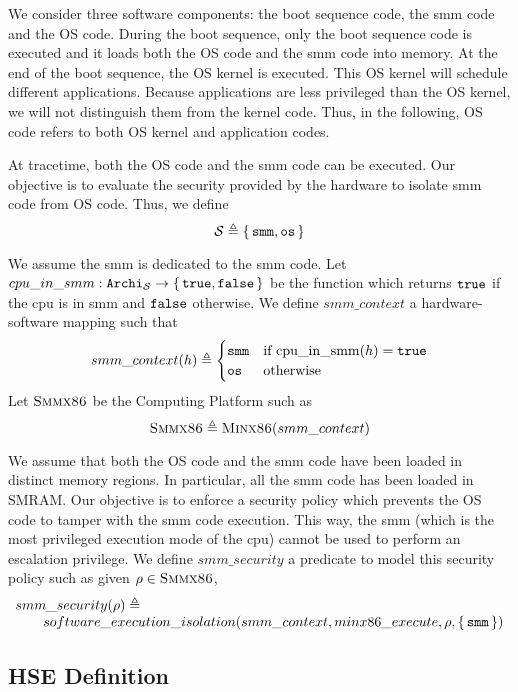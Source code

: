 We consider three software components: the boot sequence code, the \ac{smm} code
and the OS code.
%
During the boot sequence, only the boot sequence code is executed and it loads
both the OS code and the \ac{smm} code into memory.
%
At the end of the boot sequence, the OS kernel is executed.
%
This OS kernel will schedule different applications.
%
Because applications are less privileged than the OS kernel, we will not
distinguish them from the kernel code.
%
Thus, in the following, OS code refers to both OS kernel and application codes.

At tracetime, both the OS code and the \ac{smm} code can be executed.
%
Our objective is to evaluate the security provided by the hardware to isolate
\ac{smm} code from OS code.
%
Thus, we define
%
\[
  \mathcal{S} \triangleq \{\,\mathtt{smm}, \mathtt{os}\,\}
\]

We assume the \ac{smm} is dedicated to the \ac{smm} code.
%
Let
$cpu\_in\_smm : \texttt{Archi}_{\mathcal{S}} \rightarrow \{\,\mathtt{true},
  \mathtt{false}\,\}$ be the function which returns $\mathtt{true}$ if the \ac{cpu} is in
\ac{smm} and $\mathtt{false}$ otherwise.
%
We define $smm\_context$ a hardware-software mapping such that
%
\[
  smm\_context(h) \triangleq
  \begin{cases}
    \mathtt{smm} & \text{if } \mathrm{cpu\_in\_smm}(h) = \mathtt{true} \\
    \mathtt{os} & \text{otherwise}
  \end{cases}
\]
%
Let $\textsc{Smmx86}$ be the Computing Platform such as
%
\[
  \textsc{Smmx86} \triangleq \textsc{Minx86}(smm\_context)
\]

We assume that both the OS code and the \ac{smm} code have been loaded in
distinct memory regions. In particular, all the \ac{smm} code has been loaded in
SMRAM.
%
Our objective is to enforce a security policy which prevents the OS code to
tamper with the \ac{smm} code execution.
%
This way, the \ac{smm} (which is the most privileged execution mode of the
\ac{cpu}) cannot be used to perform an escalation privilege.
%
We define $smm\_security$ a predicate to model this security policy such as
given $\rho \in \textsc{Smmx86}$,
%
\[
  \begin{array}{l} smm\_security(\rho) \triangleq \\
    \qquad software\_execution\_isolation(smm\_context, minx86\_execute, \rho,
    \{\,\mathtt{smm}\,\})
  \end{array}
\]

\subsection{HSE Definition}

